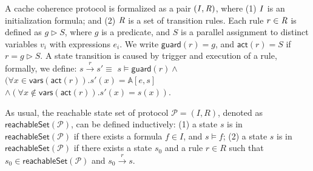 \documentclass[final]{IEEEtran}
\def \eqc {=}
\def \andc {\wedge }
\def \negc {\lnot}
\def \orc {\vee }
\newcommand{\forget}[1]{}
\begin{document}
\smallskip
{}
A cache coherence protocol is formalized as a pair $({\it I}, {\it R})$, where
(1) ${\it I}$ is an initialization formula; and
(2) ${\it R}$ is a set of transition rules. Each rule $r\in {\it R}$ is defined as
  $g \vartriangleright  S$, where $g$ is a predicate, and $S$ is a
  parallel assignment to distinct  variables $v_i$ with expressions
  $e_i$. We write $\mathsf{guard}(r)=g$, and $\mathsf{act}(r)=S$
  if $r=g \vartriangleright S$. A state transition is caused by   trigger and execution of a rule, formally, we define: $s\overset{r}{\rightarrow } s' \equiv$ $s \models \mathsf{guard}(r)\wedge$$(\forall x \in \mathsf{vars}(\mathsf{act}(r)). s'(x)=\mathbb{A}[e,s]$ $\wedge (\forall x \notin \mathsf{vars}(\mathsf{act}(r)). s'(x) = s(x))$.

  As usual, the reachable state set of protocol  $\mathcal{P}=(I,R)$, denoted as $\mathsf{reachableSet}(\mathcal{P})$, can be defined inductively: (1) a state $s$ is in
$\mathsf{reachableSet}(\mathcal{P})$ if there exists a formula $f \in I$, and $s \models  f$; (2) a state $s$ is in
$\mathsf{reachableSet}(\mathcal{P})$ if there exists a  state $s_0$  and a rule $r \in R$ such that $s_0 \in \mathsf{reachableSet}(\mathcal{P})$ and $s_0\overset{r}{\rightarrow } s$.


\forget{There are three kinds of $variables$:
1) simple identifier, denoted by a string;
2) element of an array, denoted by a string followed by a natural inside a square bracket. E.g., $arr[i]$ indicates the $i$th element of the array $arr$;
3) filed of a record, denoted by a string followed by a dot and then another string. E.g., $rcd.f$ indicates the filed $f$ of the record $rcd$.
Each variable is associated with its $type$, which can be enumeration, natural number, and Boolean.}



\forget{$Experssions$ and $formulas$ are defined mutually recursively. $Experssions$ can be simple or compound. A simple expression is either a variable or a constant, while a compound expression is constructed with the ite(if-then-else) form $f?e_1:e_2$, where $e_1$ and $e_2$ are expressions, and $f$ is a formula.
A $formula$ can be an atomic formula or a compound formula. An atomic formula can be a boolean variable or  constant, or in the equivalence form $e_1\eqc e_2$, where $e_1$ and $e_2$ are two expressions. A $formula$ can also be constructed by using the logic connectives, including negation ($\negc$), conjunction ($\andc$), disjunction ($\orc$), implication ($\dashrightarrow$).} %
\end{document}
